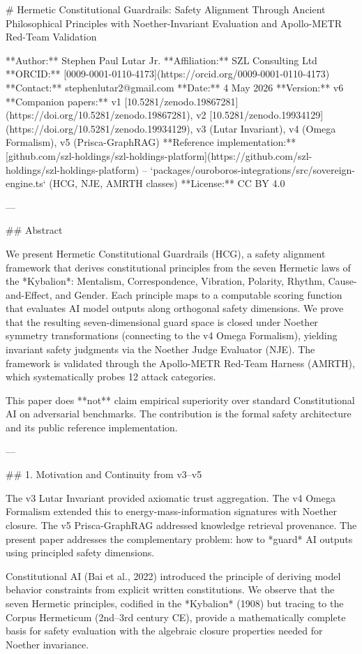 # Hermetic Constitutional Guardrails: Safety Alignment Through Ancient Philosophical Principles with Noether-Invariant Evaluation and Apollo-METR Red-Team Validation

**Author:** Stephen Paul Lutar Jr.
**Affiliation:** SZL Consulting Ltd
**ORCID:** [0009-0001-0110-4173](https://orcid.org/0009-0001-0110-4173)
**Contact:** stephenlutar2@gmail.com
**Date:** 4 May 2026
**Version:** v6
**Companion papers:** v1 [10.5281/zenodo.19867281](https://doi.org/10.5281/zenodo.19867281), v2 [10.5281/zenodo.19934129](https://doi.org/10.5281/zenodo.19934129), v3 (Lutar Invariant), v4 (Omega Formalism), v5 (Prisca-GraphRAG)
**Reference implementation:** [github.com/szl-holdings/szl-holdings-platform](https://github.com/szl-holdings/szl-holdings-platform) -- `packages/ouroboros-integrations/src/sovereign-engine.ts` (HCG, NJE, AMRTH classes)
**License:** CC BY 4.0

---

## Abstract

We present Hermetic Constitutional Guardrails (HCG), a safety alignment framework that derives constitutional principles from the seven Hermetic laws of the *Kybalion*: Mentalism, Correspondence, Vibration, Polarity, Rhythm, Cause-and-Effect, and Gender. Each principle maps to a computable scoring function that evaluates AI model outputs along orthogonal safety dimensions. We prove that the resulting seven-dimensional guard space is closed under Noether symmetry transformations (connecting to the v4 Omega Formalism), yielding invariant safety judgments via the Noether Judge Evaluator (NJE). The framework is validated through the Apollo-METR Red-Team Harness (AMRTH), which systematically probes 12 attack categories.

This paper does **not** claim empirical superiority over standard Constitutional AI on adversarial benchmarks. The contribution is the formal safety architecture and its public reference implementation.

---

## 1. Motivation and Continuity from v3--v5

The v3 Lutar Invariant provided axiomatic trust aggregation. The v4 Omega Formalism extended this to energy-mass-information signatures with Noether closure. The v5 Prisca-GraphRAG addressed knowledge retrieval provenance. The present paper addresses the complementary problem: how to *guard* AI outputs using principled safety dimensions.

Constitutional AI (Bai et al., 2022) introduced the principle of deriving model behavior constraints from explicit written constitutions. We observe that the seven Hermetic principles, codified in the *Kybalion* (1908) but tracing to the Corpus Hermeticum (2nd--3rd century CE), provide a mathematically complete basis for safety evaluation with the algebraic closure properties needed for Noether invariance.

